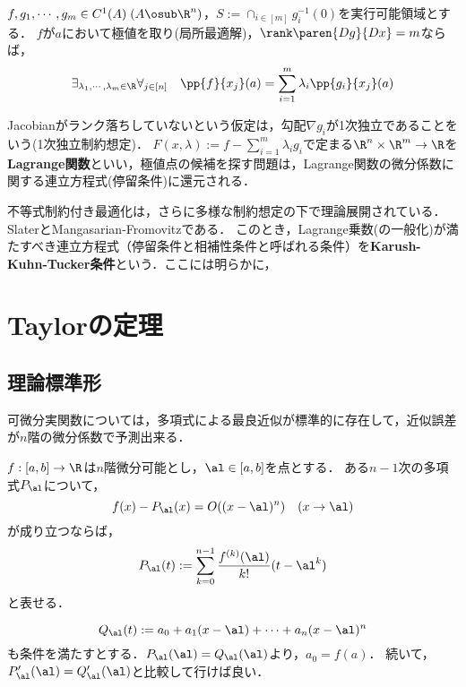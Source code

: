 \documentclass[uplatex, dvipdfmx]{jsreport}
\begin{document}
\begin{theorem}
    $f,g_1,\cdots,g_m\in C^1(A)\;(A\osub\R^n)$，$S:=\cap_{i\in[m]}g_i^{-1}(0)$を実行可能領域とする．
    $f$が$a$において極値を取り(局所最適解)，$\rank\paren{Dg}{Dx}=m$ならば，
    \[\exists_{\lambda_1,\cdots,\lambda_m\in\R}\forall_{j\in[n]}\quad\pp{f}{x_j}(a)=\sum^m_{i=1}\lambda_i\pp{g_i}{x_j}(a)\]
\end{theorem}
\begin{remarks}
    Jacobianがランク落ちしていないという仮定は，勾配$\nabla g_i$が1次独立であることをいう(1次独立制約想定)．
    $F(x,\lambda):=f-\sum^m_{i=1}\lambda_ig_i$で定まる$\R^n\times\R^m\to\R$を\textbf{Lagrange関数}といい，極値点の候補を探す問題は，Lagrange関数の微分係数に関する連立方程式(停留条件)に還元される．
\end{remarks}

\begin{remark}
    不等式制約付き最適化は，さらに多様な制約想定の下で理論展開されている．SlaterとMangasarian-Fromovitzである．
    このとき，Lagrange乗数(の一般化)が満たすべき連立方程式（停留条件と相補性条件と呼ばれる条件）を\textbf{Karush-Kuhn-Tucker条件}という．ここには明らかに，
\end{remark}

\section{Taylorの定理}

\subsection{理論標準形}

\begin{tcolorbox}[colframe=ForestGreen, colback=ForestGreen!10!white,breakable,colbacktitle=ForestGreen!40!white,coltitle=black,fonttitle=\bfseries\sffamily,
title=]
    可微分実関数については，多項式による最良近似が標準的に存在して，近似誤差が$n$階の微分係数で予測出来る．
\end{tcolorbox}

\begin{lemma}[可微分関数の多項式近似]
    $f:[a,b]\to\R$は$n$階微分可能とし，$\al\in[a,b]$を点とする．
    ある$n-1$次の多項式$P_\al$について，
    \[f(x)-P_\al(x)=O((x-\al)^n)\quad(x\to\al)\]
    が成り立つならば，
    \[P_\al(t):=\sum^{n-1}_{k=0}\frac{f^{(k)}(\al)}{k!}(t-\al^k)\]
    と表せる．
\end{lemma}
\begin{Proof}
    \[Q_\al(t):=a_0+a_1(x-\al)+\cdots+a_n(x-\al)^n\]
    も条件を満たすとする．$P_\al(\al)=Q_\al(\al)$より，$a_0=f(a)$．
    続いて，$P'_\al(\al)=Q'_\al(\al)$と比較して行けば良い．
\end{Proof}
\end{document}
